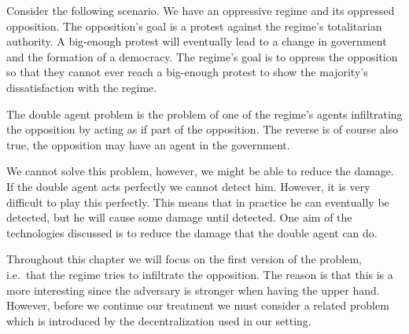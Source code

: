 Consider the following scenario.
We have an oppressive regime and its oppressed opposition.
The opposition's goal is a protest against the regime's totalitarian authority.
A big-enough protest will eventually lead to a change in government and the 
formation of a democracy.
The regime's goal is to oppress the opposition so that they cannot ever reach 
a big-enough protest to show the majority's dissatisfaction with the regime.

The double agent problem is the problem of one of the regime's agents 
infiltrating the opposition by acting as if part of the opposition.
The reverse is of course also true, the opposition may have an agent in the 
government.

We cannot solve this problem, however, we might be able to reduce the damage.
If the double agent acts perfectly we cannot detect him.
However, it is very difficult to play this perfectly.
This means that in practice he can eventually be detected, but he will cause 
some damage until detected.
One aim of the technologies discussed is to reduce the damage that the double 
agent can do.

Throughout this chapter we will focus on the first version of the problem, 
i.e.\ that the regime tries to infiltrate the opposition.
The reason is that this is a more interesting since the adversary is stronger 
when having the upper hand.
However, before we continue our treatment we must consider a related problem 
which is introduced by the decentralization used in our setting.

